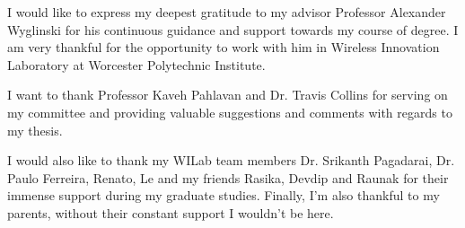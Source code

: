 I would like to express my deepest gratitude to my advisor Professor Alexander Wyglinski for his continuous guidance and support towards my course of degree. I am very thankful for the opportunity to work with him in Wireless Innovation Laboratory at Worcester Polytechnic Institute. 

I want to thank Professor Kaveh Pahlavan and Dr. Travis Collins for serving on my committee and providing valuable suggestions and comments with regards to my thesis. 

I would also like to thank my WILab team members Dr. Srikanth Pagadarai, Dr. Paulo Ferreira, Renato, Le and my friends Rasika, Devdip and Raunak for their immense support during my graduate studies. Finally, I'm also thankful to my parents, without their constant support I wouldn't be here.
